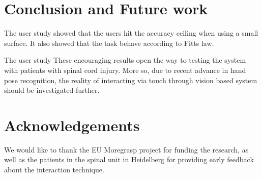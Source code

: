 \documentclass{chi-ext}
\begin{document}
\section{Conclusion and Future work}
The user study showed that the users hit the accuracy ceiling when using a small surface. It also showed that the task behave according to Fitts law.

The user study These encouraging results open the way to testing the system with patients with spinal cord injury. More so, due to recent advance in hand pose recognition, the reality of interacting via touch through vision based system should be investigated further.

\section{Acknowledgements}
We would like to thank the EU Moregrasp project for funding the research, as well as the patients in the spinal unit in Heidelberg for providing early feedback about the interaction technique.

\balance


\end{document}
